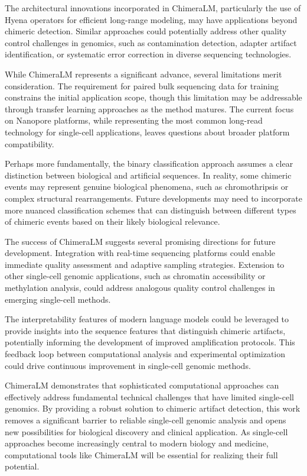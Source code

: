 \documentclass[pdflatex,sn-nature]{sn-jnl}%
\theoremstyle{thmstyleone}%
\theoremstyle{thmstyletwo}%
\theoremstyle{thmstylethree}%
\begin{document}
The architectural innovations incorporated in ChimeraLM, particularly the use of Hyena operators for efficient long-range modeling, may have applications beyond chimeric detection.
Similar approaches could potentially address other quality control challenges in genomics, such as contamination detection, adapter artifact identification, or systematic error correction in diverse sequencing technologies.

While ChimeraLM represents a significant advance, several limitations merit consideration.
The requirement for paired bulk sequencing data for training constrains the initial application scope, though this limitation may be addressable through transfer learning approaches as the method matures.
The current focus on Nanopore platforms, while representing the most common long-read technology for single-cell applications, leaves questions about broader platform compatibility.

Perhaps more fundamentally, the binary classification approach assumes a clear distinction between biological and artificial sequences.
In reality, some chimeric events may represent genuine biological phenomena, such as chromothripsis or complex structural rearrangements.
Future developments may need to incorporate more nuanced classification schemes that can distinguish between different types of chimeric events based on their likely biological relevance.

The success of ChimeraLM suggests several promising directions for future development.
Integration with real-time sequencing platforms could enable immediate quality assessment and adaptive sampling strategies.
Extension to other single-cell genomic applications, such as chromatin accessibility or methylation analysis, could address analogous quality control challenges in emerging single-cell methods.

The interpretability features of modern language models could be leveraged to provide insights into the sequence features that distinguish chimeric artifacts, potentially informing the development of improved amplification protocols.
This feedback loop between computational analysis and experimental optimization could drive continuous improvement in single-cell genomic methods.

ChimeraLM demonstrates that sophisticated computational approaches can effectively address fundamental technical challenges that have limited single-cell genomics.
By providing a robust solution to chimeric artifact detection, this work removes a significant barrier to reliable single-cell genomic analysis and opens new possibilities for biological discovery and clinical application.
As single-cell approaches become increasingly central to modern biology and medicine, computational tools like ChimeraLM will be essential for realizing their full potential.
\end{document}
